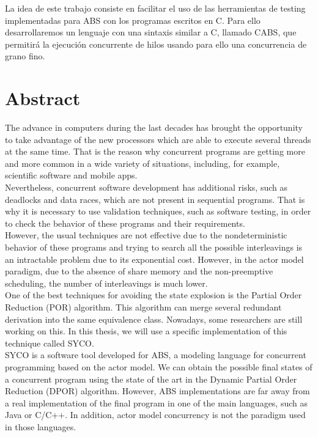 La idea de este trabajo consiste en facilitar el uso de las herramientas de testing implementadas para ABS con los programas escritos en C. Para ello desarrollaremos un lenguaje con una sintaxis similar a C, llamado CABS, que permitirá la ejecución concurrente de hilos usando para ello una concurrencia de grano fino.

\newpage
\thispagestyle{empty}

\chapter*{Abstract}
\thispagestyle{empty}
The advance in computers during the last decades has brought the opportunity to take advantage  of the new processors which are able to execute several threads at the same time. That is the reason why concurrent programs are getting more and more common in a wide variety of situations, including, for example, scientific software and mobile apps.\\

Nevertheless, concurrent software development has additional risks, such as deadlocks and data races, which are not present in sequential programs. That is why it is necessary to use validation techniques, such as software testing, in order to check the behavior of these programs and their requirements.\\

However, the usual techniques are not effective due to the nondeterministic behavior of these programs and trying to search all the possible interleavings is an intractable problem due to its exponential cost. However, in the actor model paradigm, due to the absence of share memory and the non-preemptive scheduling, the number of interleavings is much lower.\\

One of the best techniques for avoiding the state explosion is the Partial Order Reduction (POR) algorithm. This algorithm can merge several redundant derivation into the same equivalence class. Nowadays, some researchers are still working on this. In this thesis, we will use a specific implementation of this technique called SYCO.\\

SYCO is a software tool developed for ABS, a modeling language for concurrent programming based on the actor model. We can obtain the possible final states of a concurrent program using the state of the art in the Dynamic Partial Order Reduction (DPOR) algorithm. However, ABS implementations are far away from a real implementation of the final program in one of the main languages, such as Java or C/C++. In addition, actor model concurrency is not the paradigm used in those languages.\\

